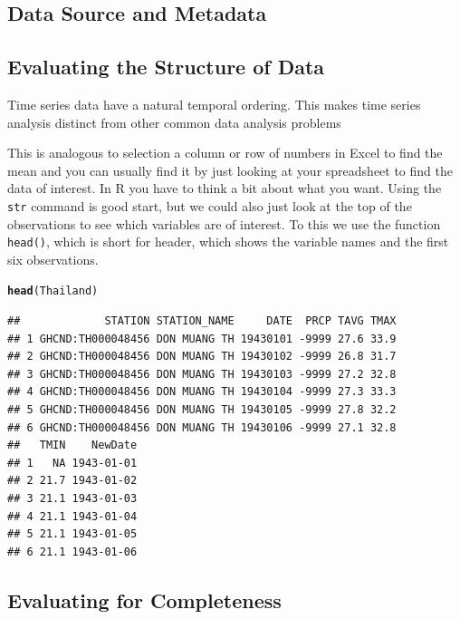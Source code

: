 \documentclass{article}\usepackage[]{graphicx}\usepackage[]{color}
\makeatletter
\newcommand{\hlstd}[1]{\textcolor[rgb]{0.345,0.345,0.345}{#1}}%
\newcommand{\hlkwd}[1]{\textcolor[rgb]{0.737,0.353,0.396}{\textbf{#1}}}%
\newenvironment{kframe}{%
 \def\at@end@of@kframe{}%
 \ifinner\ifhmode%
  \def\at@end@of@kframe{\end{minipage}}%
  \begin{minipage}{\columnwidth}%
 \fi\fi%
 \def\FrameCommand##1{\hskip\@totalleftmargin \hskip-\fboxsep
 \colorbox{shadecolor}{##1}\hskip-\fboxsep
     \hskip-\linewidth \hskip-\@totalleftmargin \hskip\columnwidth}%
 \MakeFramed {\advance\hsize-\width
   \@totalleftmargin\z@ \linewidth\hsize
   \@setminipage}}%
 {\par\unskip\endMakeFramed%
 \at@end@of@kframe}
\newenvironment{knitrout}{}{} %
\makeatother
\begin{document}
\subsection{Data Source and Metadata}

\subsection{Evaluating the Structure of Data}

Time series data have a natural temporal ordering. This makes time series analysis distinct from other common data analysis problems

This is analogous to selection a column or row of numbers in Excel to find the mean and you can usually find it by just looking at your spreadsheet to find the data of interest. In R you have to think a bit about what you want. Using the \texttt{str} command is good start, but we could also just look at the top of the observations to see which variables are of interest. To this we use the function \texttt{head()}, which is short for header, which shows the variable names and the first six observations.

\begin{knitrout}
\color{fgcolor}\begin{kframe}
\begin{alltt}
\hlkwd{head}\hlstd{(Thailand)}
\end{alltt}
\begin{verbatim}
##             STATION STATION_NAME     DATE  PRCP TAVG TMAX
## 1 GHCND:TH000048456 DON MUANG TH 19430101 -9999 27.6 33.9
## 2 GHCND:TH000048456 DON MUANG TH 19430102 -9999 26.8 31.7
## 3 GHCND:TH000048456 DON MUANG TH 19430103 -9999 27.2 32.8
## 4 GHCND:TH000048456 DON MUANG TH 19430104 -9999 27.3 33.3
## 5 GHCND:TH000048456 DON MUANG TH 19430105 -9999 27.8 32.2
## 6 GHCND:TH000048456 DON MUANG TH 19430106 -9999 27.1 32.8
##   TMIN    NewDate
## 1   NA 1943-01-01
## 2 21.7 1943-01-02
## 3 21.1 1943-01-03
## 4 21.1 1943-01-04
## 5 21.1 1943-01-05
## 6 21.1 1943-01-06
\end{verbatim}
\end{kframe}
\end{knitrout}


\subsection{Evaluating for Completeness}
\end{document}
